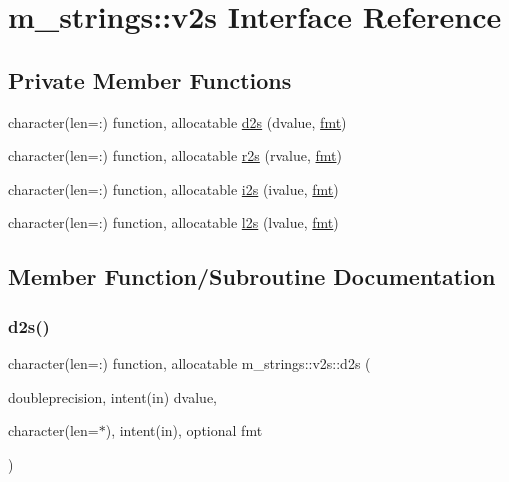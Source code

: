 \hypertarget{interfacem__strings_1_1v2s}{}\section{m\+\_\+strings\+:\+:v2s Interface Reference}
\label{interfacem__strings_1_1v2s}
\subsection*{Private Member Functions}
\begin{DoxyCompactItemize}
\item 
character(len=\+:) function, allocatable \mbox{\hyperlink{interfacem__strings_1_1v2s_a1df17f4d21b592e9c4a933dcf86a8a91}{d2s}} (dvalue, \mbox{\hyperlink{namespacem__strings_afccf1e453a4315a639f133f2f7c0078b}{fmt}})
\item 
character(len=\+:) function, allocatable \mbox{\hyperlink{interfacem__strings_1_1v2s_ad9e4275fa6b90c13b2c022c55338ce57}{r2s}} (rvalue, \mbox{\hyperlink{namespacem__strings_afccf1e453a4315a639f133f2f7c0078b}{fmt}})
\item 
character(len=\+:) function, allocatable \mbox{\hyperlink{interfacem__strings_1_1v2s_ae991f00bc56ef9caf798df25e74009b9}{i2s}} (ivalue, \mbox{\hyperlink{namespacem__strings_afccf1e453a4315a639f133f2f7c0078b}{fmt}})
\item 
character(len=\+:) function, allocatable \mbox{\hyperlink{interfacem__strings_1_1v2s_a8bda20246f1ced2d83837937634bb3ca}{l2s}} (lvalue, \mbox{\hyperlink{namespacem__strings_afccf1e453a4315a639f133f2f7c0078b}{fmt}})
\end{DoxyCompactItemize}


\subsection{Member Function/\+Subroutine Documentation}
\mbox{\label{interfacem__strings_1_1v2s_a1df17f4d21b592e9c4a933dcf86a8a91}} 
\subsubsection{\texorpdfstring{d2s()}{d2s()}}
{\footnotesize\ttfamily character(len=\+:) function, allocatable m\+\_\+strings\+::v2s\+::d2s (\begin{DoxyParamCaption}\item[{doubleprecision, intent(in)}]{dvalue,  }\item[{character(len=$\ast$), intent(in), optional}]{fmt }\end{DoxyParamCaption})\hspace{0.3cm}{\ttfamily [private]}}

